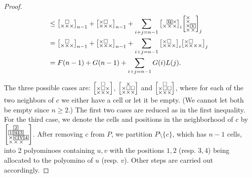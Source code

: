 \documentclass[a4paper,12pt]{article}
\makeatletter
\newcommand{\mybox}[1]{%
  \begingroup
  \setlength{\fboxsep}{1pt}%
  \fbox{\small #1}%
  \endgroup
}
\newenvironment{grid}
  {\begingroup\footnotesize
   \renewcommand{\arraystretch}{0}
   \setlength{\arraycolsep}{0pt}
   \left[\begin{array}{@{}*{10}{c}@{}}}
  {\end{array}\right]\endgroup}
\newcommand{\void}{\phantom{\times}}
\newcommand{\myF}{
    \begin{grid}
        \void & \square & \void \\
        \times & \times & \times
    \end{grid}
}
\newcommand{\myG}{
    \begin{grid}
        \times & \square & \void \\
        \times & \times & \times
    \end{grid}
}
\newcommand{\myL}{
    \begin{grid}
        \times & \square & \void & \void \\
        \times & \times & \times & \times
    \end{grid}
}
\makeatother
\begin{document}
\begin{proof}
\begin{align*}
    &\le \begin{grid}
        \void & \square & \void \\
        \times & \times & \times
    \end{grid}_{n-1}
    + \myG_{n-1}
    + \sum_{i+j=n-1}\begin{grid}
        \void & \mybox{u} & \times \\
        \times & \times & \times    \end{grid}_{i}  \begin{grid}
        \times & \void \\
        \times & \void \\
        \times & \mybox{v} \\
        \times & \times
    \end{grid}_{j} \\
    &= \myF_{n-1}
    + \myG_{n-1}
    + \sum_{i+j=n-1}\myG_{i} \myL_{j} \\
    &= F(n-1) + G(n-1) + \sum_{i+j=n-1} G(i) L(j).
\end{align*}

The three possible cases are:
$\begin{grid}
        \void & \square & \void \\
        \times & \square & \times \\
        \times & \times & \times
    \end{grid}$, $\begin{grid}
        \void & \times & \void \\
        \times & \square & \square \\
        \times & \times & \times
    \end{grid}$ and $\begin{grid}
        \void & \square & \void \\
        \times & \square & \square \\
        \times & \times & \times
    \end{grid}$, where for each of the two neighbors of $c$ we either have a cell or let it be empty. (We cannot let both be empty since $n\ge 2$.)
    The first two cases are reduced as in the first inequality. For the third case, we denote the cells and positions in the neighborhood of $c$ by $\begin{grid}
        \void & \mybox{\scriptsize 2} & \void & \void \\
        \mybox{\scriptsize 1} & \mybox{u} & \mybox{\scriptsize 3} & \void \\
        \times & \mybox{c} & \mybox{v} & \mybox{\scriptsize 4} \\
        \times & \times & \times & \void
    \end{grid}$. After removing $c$ from $P$, we partition $P\setminus\{c\}$, which has $n-1$ cells, into 2 polyominoes containing $u,v$ with the positions $1,2$ (resp. $3,4$) being allocated to the polyomino of $u$ (resp. $v$). Other steps are carried out accordingly.
    


\end{proof}
\end{document}
